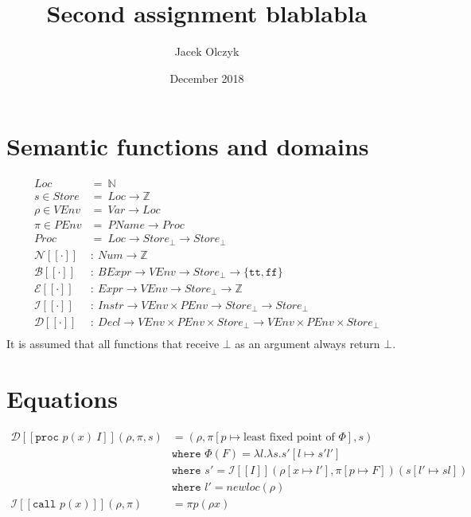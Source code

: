\documentclass{article}
\title{Second assignment blablabla}
\author{Jacek Olczyk}
\date{December 2018}
\begin{document}
\maketitle
\section{Semantic functions and domains}

\begin{align*}
Loc&=\ \mathbb{N}\\
s\in Store&=\ Loc \rightarrow \mathbb{Z}\\
\rho\in VEnv &=\ Var \rightarrow Loc\\
\pi\in PEnv &=\ PName \rightarrow Proc\\
Proc &=\ Loc \rightarrow Store_\bot \rightarrow Store_\bot\\
\mathcal{N}[[\cdot]]&:\ Num \rightarrow \mathbb{Z}\\
\mathcal{B}[[\cdot]]&:\ BExpr \rightarrow VEnv \rightarrow  Store_\bot \rightarrow \{\texttt{tt}, \texttt{ff}\}\\
\mathcal{E}[[\cdot]]&:\ Expr \rightarrow VEnv \rightarrow  Store_\bot \rightarrow \mathbb{Z}\\
\mathcal{I}[[\cdot]]&:\ Instr \rightarrow VEnv \times PEnv  \rightarrow Store_\bot  \rightarrow Store_\bot\\
\mathcal{D}[[\cdot]]&:\ Decl \rightarrow VEnv \times PEnv\times Store_\bot \rightarrow VEnv\times PEnv\times Store_\bot\\
\end{align*}
It is assumed that all functions that receive $ \bot $ as an argument always return $ \bot $.
\section{Equations}

\begin{align*}
\mathcal{D}[[\texttt{proc }p(x)\ I]](\rho, \pi, s)&=(\rho, \pi[p\mapsto \text{least fixed point of }\Phi], s)\\
&\texttt{where }\Phi(F)=\lambda l.\lambda s.s'[l\mapsto s'l'] \\
&\texttt{where }s'=\mathcal{I}[[I]](\rho[x\mapsto l'],\pi[p\mapsto F])(s[l'\mapsto sl])\\
&\texttt{where }l'=newloc(\rho)\\
\mathcal{I}[[\texttt{call }p(x)]](\rho,\pi) &= \pi p(\rho x)
\end{align*}
\end{document}

